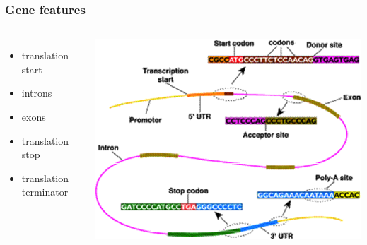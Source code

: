 
%
\begin{frame}
  \frametitle{Gene features}
  \begin{columns}[T] 
      \begin{itemize}
        \item translation start
        \item introns
        \item exons
        \item translation stop
        \item translation terminator
      \end{itemize}
      \includegraphics[width=\textwidth]{images/gene_feature}
  \end{columns}    
\end{frame}

